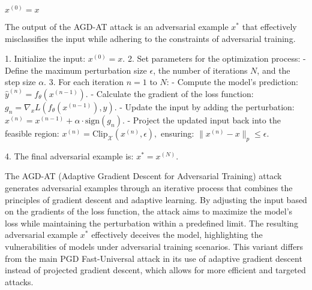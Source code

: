  $x^{(0)} = x$

The output of the AGD-AT attack is an adversarial example $x^*$ that effectively misclassifies the input while adhering to the constraints of adversarial training.

1. Initialize the input:
   $
   x^{(0)} = x.
   $
2. Set parameters for the optimization process:
   - Define the maximum perturbation size $\epsilon$, the number of iterations $N$, and the step size $\alpha$.
3. For each iteration $n = 1$ to $N$:
   - Compute the model's prediction:
   $
   \hat{y}^{(n)} = f_{\theta}(x^{(n-1)}).
   $
   - Calculate the gradient of the loss function:
   $
   g_n = \nabla_x L(f_{\theta}(x^{(n-1)}), y).
   $
   - Update the input by adding the perturbation:
   $
   x^{(n)} = x^{(n-1)} + \alpha \cdot \text{sign}(g_n).
   $
   - Project the updated input back into the feasible region:
   $
   x^{(n)} = \text{Clip}_{\mathcal{X}}(x^{(n)}, \epsilon),
   $
   ensuring:
   $
   \|x^{(n)} - x\|_p \leq \epsilon.
   $

4. The final adversarial example is:
   $
   x^* = x^{(N)}.
   $

The AGD-AT (Adaptive Gradient Descent for Adversarial Training) attack generates adversarial examples through an iterative process that combines the principles of gradient descent and adaptive learning. By adjusting the input based on the gradients of the loss function, the attack aims to maximize the model's loss while maintaining the perturbation within a predefined limit. The resulting adversarial example $x^*$ effectively deceives the model, highlighting the vulnerabilities of models under adversarial training scenarios. This variant differs from the main PGD Fast-Universal attack in its use of adaptive gradient descent instead of projected gradient descent, which allows for more efficient and targeted attacks.
